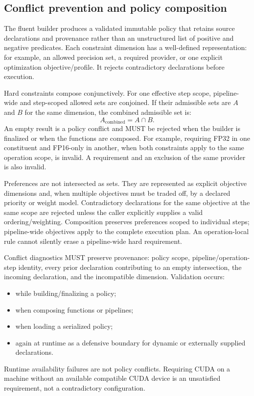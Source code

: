 \documentclass[11pt,a4paper,oneside]{article}
\begin{document}
\subsection{Conflict prevention and policy composition}

The fluent builder produces a validated immutable policy that retains source declarations and provenance rather than an unstructured list of positive and negative predicates. Each constraint dimension has a well-defined representation: for example, an allowed precision set, a required provider, or one explicit optimization objective/profile. It rejects contradictory declarations before execution.

Hard constraints compose conjunctively. For one effective step scope, pipeline-wide and step-scoped allowed sets are conjoined. If their admissible sets are $A$ and $B$ for the same dimension, the combined admissible set is:
\[
  A_{\mathrm{combined}} = A \cap B.
\]
An empty result is a policy conflict and MUST be rejected when the builder is finalized or when the functions are composed. For example, requiring FP32 in one constituent and FP16-only in another, when both constraints apply to the same operation scope, is invalid. A requirement and an exclusion of the same provider is also invalid.

Preferences are not intersected as sets. They are represented as explicit objective dimensions and, when multiple objectives must be traded off, by a declared priority or weight model. Contradictory declarations for the same objective at the same scope are rejected unless the caller explicitly supplies a valid ordering/weighting. Composition preserves preferences scoped to individual steps; pipeline-wide objectives apply to the complete execution plan. An operation-local rule cannot silently erase a pipeline-wide hard requirement.

Conflict diagnostics MUST preserve provenance: policy scope, pipeline/operation-step identity, every prior declaration contributing to an empty intersection, the incoming declaration, and the incompatible dimension. Validation occurs:
\begin{itemize}
  \item while building/finalizing a policy;
  \item when composing functions or pipelines;
  \item when loading a serialized policy;
  \item again at runtime as a defensive boundary for dynamic or externally supplied declarations.
\end{itemize}
Runtime availability failures are not policy conflicts. Requiring CUDA on a machine without an available compatible CUDA device is an unsatisfied requirement, not a contradictory configuration.
\end{document}
